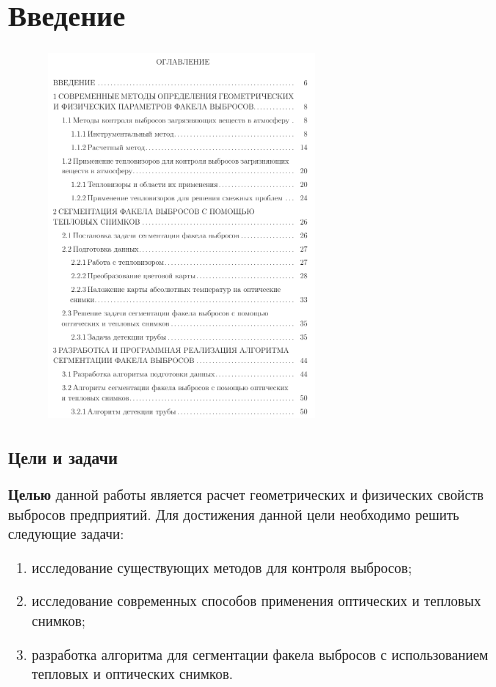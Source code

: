 \documentclass[t]{beamer}
\begin{document}
	
	\firstpage
	\justifying
\section{Введение}
	\begin{frame}
		\vspace*{-1.3cm}
		\begin{figure}
			\centering
			\includegraphics[width = 0.63\textwidth]{image/ToC2}	
		\end{figure}
	\end{frame}

	\begin{frame}
		\frametitle{Цели и задачи} 
		\textbf{Целью} данной работы является расчет геометрических и физических свойств выбросов предприятий. Для достижения данной цели необходимо решить следующие задачи:
		\begin{enumerate}
			\justifying
			\item исследование существующих методов для контроля выбросов;
			\item исследование современных способов применения оптических и тепловых снимков;
			\item разработка алгоритма для сегментации факела выбросов с использованием тепловых и оптических снимков.
		\end{enumerate}
	\end{frame}
\end{document}
